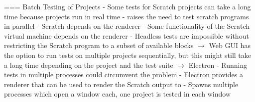 === Batch Testing of Projects
- Some tests for Scratch projects can take a long time because projects run in real time
    - raises the need to test scratch programs in parallel
    - Scratch depends on the renderer
        - Some functionality of the Scratch virtual machine depends on the renderer
        - Headless tests are impossible without restricting the Scratch program to a subset of available blocks
$\rightarrow$ Web GUI has the option to run tests on multiple projects sequentially, but this might still take a long time depending on the project and the test suite
$\rightarrow$ Electron
    - Running tests in multiple processes could circumvent the problem
    - Electron provides a renderer that can be used to render the Scratch output to
    - Spawns multiple processes which open a window each, one project is tested in each window
